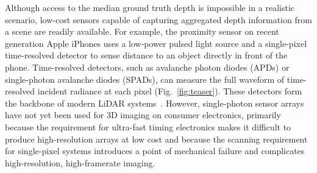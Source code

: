 







Although access to the median ground truth depth is impossible in a realistic
scenario, low-cost sensors capable of capturing aggregated depth information
from a scene are readily available. For example, the proximity sensor on recent
generation Apple iPhones uses a low-power pulsed light source and a
single-pixel time-resolved detector %
to sense distance to an
object directly in front of the phone. %
Time-resolved detectors, such as avalanche photon diodes (APDs) or single-photon
avalanche diodes (SPADs), can measure the full waveform of time-resolved incident
radiance at each pixel (Fig.~\ref{fig:teaser}). These detectors form the
backbone of modern LiDAR
systems~\cite{Kirmani:2014,Li:2019,pawlikowska2017single}. However,
single-photon sensor arrays have
not yet been used for 3D imaging on consumer electronics, primarily because the requirement for
ultra-fast timing electronics makes it difficult to produce high-resolution
arrays at low cost and because the scanning requirement for single-pixel
systems introduces a point of mechanical failure and complicates
high-resolution, high-framerate imaging.


